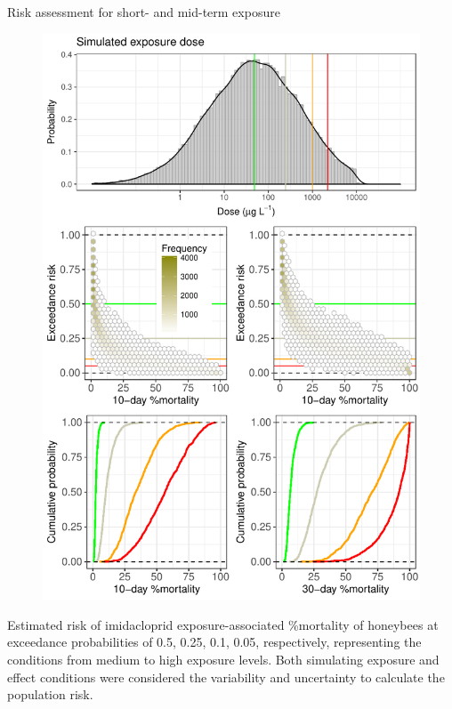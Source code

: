 \documentclass[final,t]{beamer}
\begin{document}
\begin{frame}[fragile]
\begin{columns}[t]
\begin{column}{0.24\linewidth}
      \begin{block}{Risk assessment for short- and mid-term exposure}
      \begin{figure}[htb]
      \includegraphics[width=.9\columnwidth]{fig4}
      \end{figure}
      Estimated risk of imidacloprid exposure-associated \%mortality of honeybees at exceedance probabilities of 0.5, 0.25, 0.1, 0.05, respectively, representing the conditions from medium to high exposure levels. Both simulating exposure and effect conditions were considered the variability and uncertainty to calculate the population risk. 
      \end{block}      
    \end{column}
    

\end{columns}
\end{frame}
\end{document}

